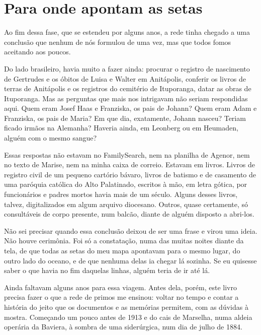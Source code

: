 \documentclass[
  brazilian,
  11pt,
  openany]{book}
\begin{document}
\section{Para onde apontam as setas}\label{para-onde-apontam-as-setas}

Ao fim dessa fase, que se estendeu por alguns anos, a rede tinha chegado
a uma conclusão que nenhum de nós formulou de uma vez, mas que todos
fomos aceitando aos poucos.

Do lado brasileiro, havia muito a fazer ainda: procurar o registro de
nascimento de Gertrudes e os óbitos de Luisa e Walter em Anitápolis,
conferir os livros de terras de Anitápolis e os registros do cemitério
de Ituporanga, datar as obras de Ituporanga. Mas as perguntas que mais
nos intrigavam não seriam respondidas aqui. Quem eram Josef Haas e
Franziska, os pais de Johann? Quem eram Adam e Franziska, os pais de
Maria? Em que dia, exatamente, Johann nasceu? Teriam ficado irmãos na
Alemanha? Haveria ainda, em Leonberg ou em Heumaden, alguém com o mesmo
sangue?

Essas respostas não estavam no FamilySearch, nem na planilha de Agenor,
nem no texto de Marise, nem na minha caixa de correio. Estavam em
livros. Livros de registro civil de um pequeno cartório bávaro, livros
de batismo e de casamento de uma paróquia católica do Alto Palatinado,
escritos à mão, em letra gótica, por funcionários e padres mortos havia
mais de um século. Alguns desses livros, talvez, digitalizados em algum
arquivo diocesano. Outros, quase certamente, só consultáveis de corpo
presente, num balcão, diante de alguém disposto a abri-los.

Não sei precisar quando essa conclusão deixou de ser uma frase e virou
uma ideia. Não houve cerimônia. Foi só a constatação, numa das muitas
noites diante da tela, de que todas as setas do meu mapa apontavam para
o mesmo lugar, do outro lado do oceano, e de que nenhuma delas ia chegar
lá sozinha. Se eu quisesse saber o que havia no fim daquelas linhas,
alguém teria de ir até lá.

Ainda faltavam alguns anos para essa viagem. Antes dela, porém, este
livro precisa fazer o que a rede de primos me ensinou: voltar no tempo e
contar a história do jeito que os documentos e as memórias permitem, com
as dúvidas à mostra. Começando um pouco antes de 1913 e do cais de
Marselha, numa aldeia operária da Baviera, à sombra de uma siderúrgica,
num dia de julho de 1884.
\end{document}
